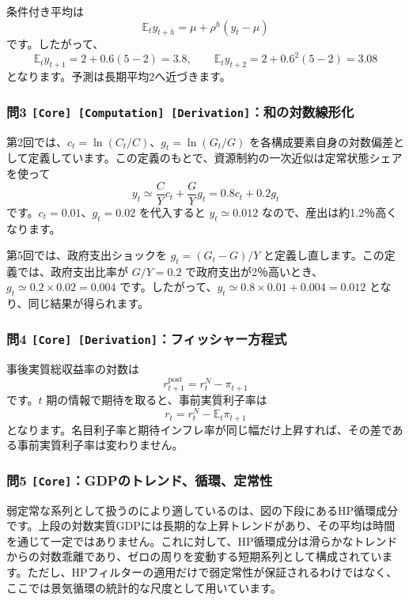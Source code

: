 \documentclass[
  japanese,
  lualatex,
  ja=standard,
  11pt,
  a4paper]{ltjsarticle}
\begin{document}
条件付き平均は \[
\mathbb E_t y_{t+h}=\mu+\rho^h(y_t-\mu)
\] です。したがって、 \[
\mathbb E_t y_{t+1}=2+0.6(5-2)=3.8,
\qquad
\mathbb E_t y_{t+2}=2+0.6^2(5-2)=3.08
\] となります。予測は長期平均2へ近づきます。

\subsubsection{\texorpdfstring{問3
\texttt{{[}Core{]}\ {[}Computation{]}\ {[}Derivation{]}}：和の対数線形化}{問3 {[}Core{]} {[}Computation{]} {[}Derivation{]}：和の対数線形化}}\label{ux554f3-core-computation-derivationux548cux306eux5bfeux6570ux7ddaux5f62ux5316}

第2回では、\(c_t=\ln(C_t/C)\)、\(g_t=\ln(G_t/G)\)
を各構成要素自身の対数偏差として定義しています。この定義のもとで、資源制約の一次近似は定常状態シェアを使って
\[
y_t\simeq\frac{C}{Y}c_t+\frac{G}{Y}g_t
=0.8c_t+0.2g_t
\] です。\(c_t=0.01\)、\(g_t=0.02\) を代入すると \(y_t\simeq0.012\)
なので、産出は約1.2％高くなります。

第5回では、政府支出ショックを \(g_t=(G_t-G)/Y\)
と定義し直します。この定義では、政府支出比率が \(G/Y=0.2\)
で政府支出が2％高いとき、\(g_t\simeq0.2\times0.02=0.004\)
です。したがって、\(y_t\simeq0.8\times0.01+0.004=0.012\)
となり、同じ結果が得られます。

\subsubsection{\texorpdfstring{問4
\texttt{{[}Core{]}\ {[}Derivation{]}}：フィッシャー方程式}{問4 {[}Core{]} {[}Derivation{]}：フィッシャー方程式}}\label{ux554f4-core-derivationux30d5ux30a3ux30c3ux30b7ux30e3ux30fcux65b9ux7a0bux5f0f}

事後実質総収益率の対数は \[
r_{t+1}^{\mathrm{post}}=r_t^N-\pi_{t+1}
\] です。\(t\) 期の情報で期待を取ると、事前実質利子率は \[
r_t=r_t^N-\mathbb E_t\pi_{t+1}
\]
となります。名目利子率と期待インフレ率が同じ幅だけ上昇すれば、その差である事前実質利子率は変わりません。

\subsubsection{\texorpdfstring{問5
\texttt{{[}Core{]}}：GDPのトレンド、循環、定常性}{問5 {[}Core{]}：GDPのトレンド、循環、定常性}}\label{ux554f5-coregdpux306eux30c8ux30ecux30f3ux30c9ux5faaux74b0ux5b9aux5e38ux6027}

弱定常な系列として扱うのにより適しているのは、図の下段にあるHP循環成分です。上段の対数実質GDPには長期的な上昇トレンドがあり、その平均は時間を通じて一定ではありません。これに対して、HP循環成分は滑らかなトレンドからの対数乖離であり、ゼロの周りを変動する短期系列として構成されています。ただし、HPフィルターの適用だけで弱定常性が保証されるわけではなく、ここでは景気循環の統計的な尺度として用いています。
\end{document}
